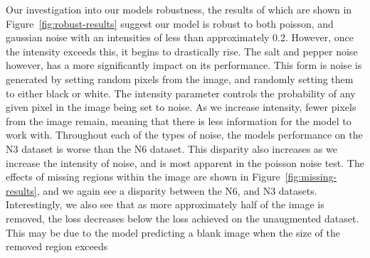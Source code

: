 \documentclass[twocolumn]{article}
\begin{document}
Our investigation into our models robustness, the results of which are shown in Figure~\ref{fig:robust-results} suggest our model is robust to both poisson, and gaussian noise with an intensities of less than approximately 0.2. However, once the intensity exceeds this, it begins to drastically rise. The salt and pepper noise however, has a more significantly impact on its performance. This form is noise is generated by setting random pixels from the image, and randomly setting them to either black or white. The intensity parameter controls the probability of any given pixel in the image being set to noise. As we increase intensity, fewer pixels from the image remain, meaning that there is less information for the model to work with. Throughout each of the types of noise, the models performance on the N3 dataset is worse than the N6 dataset. This disparity also increases as we increase the intensity of noise, and is most apparent in the poisson noise test. The effects of missing regions within the image are shown in Figure~\ref{fig:missing-results}, and we again see a disparity between the N6, and N3 datasets. Interestingly, we also see that as more approximately half of the image is removed, the loss decreases below the loss achieved on the unaugmented dataset. This may be due to the model predicting a blank image when the size of the removed region exceeds 
\end{document}
